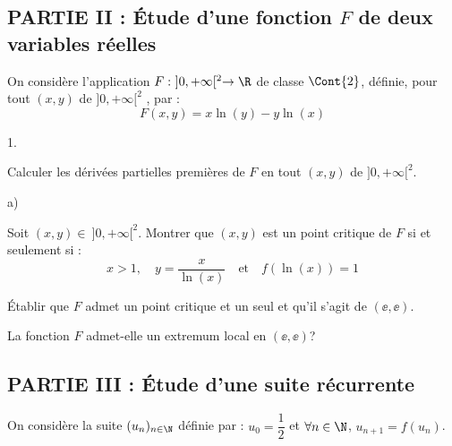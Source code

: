 \documentclass[11pt]{article}%
\begin{document}


\subsection*{PARTIE II : Étude d'une fonction $F$ de deux 
variables réelles}

\noindent
On considère l'application $F: \ ]0,+\infty[^2 \to \R$ de 
classe $\Cont{2}$, définie, pour tout $(x,y)$ de $]0,+\infty[^2$ , par 
: 
\[
F(x,y)=x\ln(y)-y\ln(x)
\]
\begin{noliste}{1.}
  \setlength{\itemsep}{2mm} %
  \setcounter{enumi}{5}
\item Calculer les dérivées partielles premières de $F$ en tout
  $(x,y)$ de $]0,+\infty[^2$.

  
  

\item
\begin{noliste}{a)}
\item Soit $(x,y)\in \ ]0,+\infty[^2$. Montrer que $(x,y)$ est un point 
critique de $F$ si et seulement si :
\[
x > 1, \quad y=\dfrac{x}{\ln(x)} \quad \text{et} \quad 
f\left(\ln(x)\right)=1
\]




\item Établir que $F$ admet un point critique et un seul et qu'il
  s'agit de $(\ee,\ee)$.

  

\end{noliste}

\item La fonction $F$ admet-elle un extremum local en $(\ee,\ee)$?

  
  
\end{noliste}

\subsection*{PARTIE III : Étude d'une suite récurrente}

\noindent
On considère la suite $(u_n)_{n\in \N}$ définie par : $u_0 =
\dfrac{1}{2}$ \quad et \quad $\forall n\in \N$, $u_{n+1} = f(u_n)$.
\end{document}
